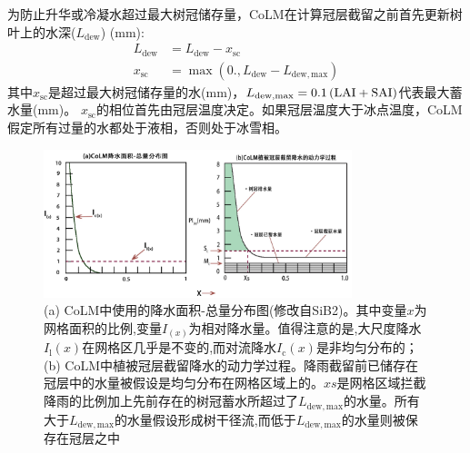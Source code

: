 为防止升华或冷凝水超过最大树冠储存量，CoLM在计算冠层截留之前首先更新树叶上的水深($L_{\mathrm{dew}}$) (mm):
\begin{equation}
  \begin{aligned}
    L_{\mathrm{dew}} &= L_{\mathrm{dew}}-x_{\mathrm{sc}} \\
    x_{\mathrm{s c}} &= \max\left(0., L_{\mathrm{dew}}-L_{\mathrm {dew,max}}\right)
  \end{aligned}
\end{equation}
其中$x_{\mathrm{sc}}$是超过最大树冠储存量的水(mm)，$L_{\mathrm {dew,max}} =0.1\left({\rm LAI}+{\rm SAI}\right)$代表最大蓄水量(mm)。
$x_{\mathrm{sc}}$的相位首先由冠层温度决定。如果冠层温度大于冰点温度，CoLM假定所有过量的水都处于液相，否则处于冰雪相。
{
  \begin{figure}[htbp]
    \centering
    \includegraphics[width=0.8\textwidth]{Figures/植被冠层和土壤水分/CoLM冠层截留示意图.jpg}
    \caption[(a) CoLM中使用的降水面积-总量分布图；(b) CoLM中植被冠层截留降水的动力学过程]{(a) CoLM中使用的降水面积-总量分布图(修改自SiB2)。其中变量$x$为网格面积的比例,变量$I_{\left(x\right)}$为相对降水量。值得注意的是,大尺度降水$I_{\mathrm {l}} \left(x\right)$在网格区几乎是不变的,而对流降水$I_{\mathrm {c}} \left(x\right)$是非均匀分布的；(b) CoLM中植被冠层截留降水的动力学过程。降雨截留前已储存在冠层中的水量被假设是均匀分布在网格区域上的。$xs$是网格区域拦截降雨的比例加上先前存在的树冠蓄水所超过了$L_{\mathrm {dew,max}}$的水量。所有大于$L_{\mathrm {dew,max}}$的水量假设形成树干径流,而低于$L_{\mathrm {dew,max}}$的水量则被保存在冠层之中}
    \label{fig:CoLM冠层截留示意图}
  \end{figure}
}

